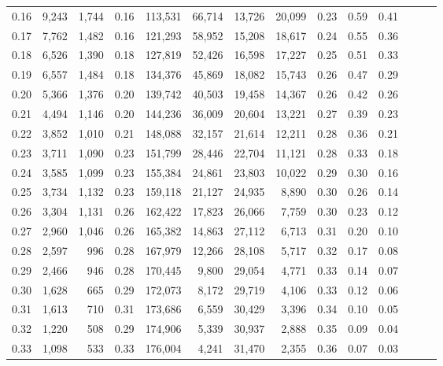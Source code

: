 \begin{tabular}{rrrrrrrrrrrrrr}
0.16 &   9,243 &  1,744 &  0.16 &  113,531 &   66,714 &  13,726 &  20,099 &  0.23 &  0.59 &      0.41 \\
0.17 &   7,762 &  1,482 &  0.16 &  121,293 &   58,952 &  15,208 &  18,617 &  0.24 &  0.55 &      0.36 \\
0.18 &   6,526 &  1,390 &  0.18 &  127,819 &   52,426 &  16,598 &  17,227 &  0.25 &  0.51 &      0.33 \\
0.19 &   6,557 &  1,484 &  0.18 &  134,376 &   45,869 &  18,082 &  15,743 &  0.26 &  0.47 &      0.29 \\
0.20 &   5,366 &  1,376 &  0.20 &  139,742 &   40,503 &  19,458 &  14,367 &  0.26 &  0.42 &      0.26 \\
0.21 &   4,494 &  1,146 &  0.20 &  144,236 &   36,009 &  20,604 &  13,221 &  0.27 &  0.39 &      0.23 \\
0.22 &   3,852 &  1,010 &  0.21 &  148,088 &   32,157 &  21,614 &  12,211 &  0.28 &  0.36 &      0.21 \\
0.23 &   3,711 &  1,090 &  0.23 &  151,799 &   28,446 &  22,704 &  11,121 &  0.28 &  0.33 &      0.18 \\
0.24 &   3,585 &  1,099 &  0.23 &  155,384 &   24,861 &  23,803 &  10,022 &  0.29 &  0.30 &      0.16 \\
0.25 &   3,734 &  1,132 &  0.23 &  159,118 &   21,127 &  24,935 &   8,890 &  0.30 &  0.26 &      0.14 \\
0.26 &   3,304 &  1,131 &  0.26 &  162,422 &   17,823 &  26,066 &   7,759 &  0.30 &  0.23 &      0.12 \\
0.27 &   2,960 &  1,046 &  0.26 &  165,382 &   14,863 &  27,112 &   6,713 &  0.31 &  0.20 &      0.10 \\
0.28 &   2,597 &    996 &  0.28 &  167,979 &   12,266 &  28,108 &   5,717 &  0.32 &  0.17 &      0.08 \\
0.29 &   2,466 &    946 &  0.28 &  170,445 &    9,800 &  29,054 &   4,771 &  0.33 &  0.14 &      0.07 \\
0.30 &   1,628 &    665 &  0.29 &  172,073 &    8,172 &  29,719 &   4,106 &  0.33 &  0.12 &      0.06 \\
0.31 &   1,613 &    710 &  0.31 &  173,686 &    6,559 &  30,429 &   3,396 &  0.34 &  0.10 &      0.05 \\
0.32 &   1,220 &    508 &  0.29 &  174,906 &    5,339 &  30,937 &   2,888 &  0.35 &  0.09 &      0.04 \\
0.33 &   1,098 &    533 &  0.33 &  176,004 &    4,241 &  31,470 &   2,355 &  0.36 &  0.07 &      0.03 \\

\end{tabular}
